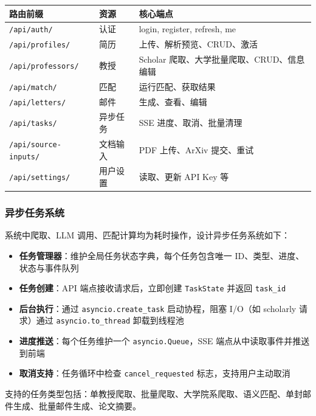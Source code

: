 \documentclass[11pt]{article}
\begin{document}
\begin{center}
\begin{tabular}{lll}
\toprule
\textbf{路由前缀} & \textbf{资源} & \textbf{核心端点} \\
\midrule
\texttt{/api/auth/} & 认证 & login, register, refresh, me \\
\texttt{/api/profiles/} & 简历 & 上传、解析预览、CRUD、激活 \\
\texttt{/api/professors/} & 教授 & Scholar 爬取、大学批量爬取、CRUD、信息编辑 \\
\texttt{/api/match/} & 匹配 & 运行匹配、获取结果 \\
\texttt{/api/letters/} & 邮件 & 生成、查看、编辑 \\
\texttt{/api/tasks/} & 异步任务 & SSE 进度、取消、批量清理 \\
\texttt{/api/source-inputs/} & 文档输入 & PDF 上传、ArXiv 提交、重试 \\
\texttt{/api/settings/} & 用户设置 & 读取、更新 API Key 等 \\
\bottomrule
\end{tabular}
\end{center}

\subsubsection{异步任务系统}

系统中爬取、LLM 调用、匹配计算均为耗时操作，设计异步任务系统如下：

\begin{itemize}
    \item \textbf{任务管理器}：维护全局任务状态字典，每个任务包含唯一 ID、类型、进度、状态与事件队列
    \item \textbf{任务创建}：API 端点接收请求后，立即创建 \texttt{TaskState} 并返回 \texttt{task\_id}
    \item \textbf{后台执行}：通过 \texttt{asyncio.create\_task} 启动协程，阻塞 I/O（如 scholarly 请求）通过 \texttt{asyncio.to\_thread} 卸载到线程池
    \item \textbf{进度推送}：每个任务维护一个 \texttt{asyncio.Queue}，SSE 端点从中读取事件并推送到前端
    \item \textbf{取消支持}：任务循环中检查 \texttt{cancel\_requested} 标志，支持用户主动取消
\end{itemize}

支持的任务类型包括：单教授爬取、批量爬取、大学院系爬取、语义匹配、单封邮件生成、批量邮件生成、论文摘要。
\end{document}
